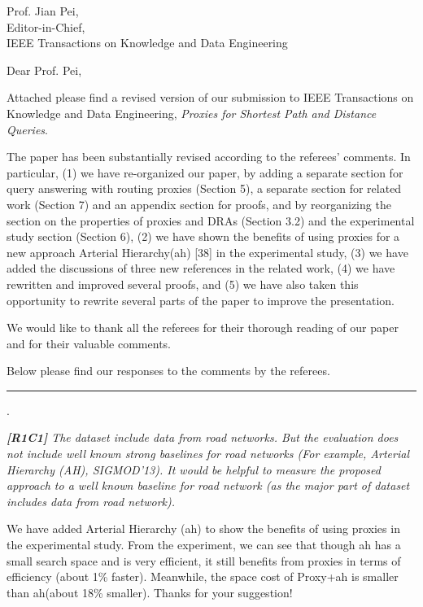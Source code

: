 \documentclass[11pt]{letter}
\date{}
\newcommand{\svs}{\vspace{0.36ex}}
\newcommand{\stitle}[1]{\vspace{0.5ex} \noindent{\bf #1}}
\newcommand{\ah}{{\sc ah}\xspace}
\begin{document}
\noindent
Prof. Jian Pei,\\
Editor-in-Chief,\\
IEEE Transactions on Knowledge and Data Engineering

\vspace{0.3cm}
\noindent
Dear Prof. Pei,


Attached please find a revised version of our submission to IEEE Transactions on Knowledge and Data Engineering,
{\em Proxies for Shortest Path and Distance Queries}.

The paper has been substantially revised according to the referees' comments. In particular,
%
(1) we have re-organized our paper, by adding a separate section for query answering with routing proxies (Section 5), a separate section for related work (Section 7) and an appendix section for proofs, and by reorganizing the section on the properties of proxies and DRAs (Section 3.2) and the experimental study section (Section 6),
%
(2) we have shown the benefits of using proxies for a new approach Arterial Hierarchy(\ah) [38] in the experimental study,
%
(3) we have added the discussions of three new references in the related work, 
%
(4) we have rewritten and improved several proofs, and
%
(5) we have also taken this opportunity to rewrite several parts of the paper to improve the presentation.



We would like to thank all the referees for their thorough reading of our
paper and for their valuable comments.

Below please find our responses to the comments by the referees.

\vspace{3.6ex}
\hrule
\vspace{0.6ex}

\vspace{2ex} \stitle{Response to the comments of Referee 1}.

{\em
{\bf [R1C1]} The dataset include data from road networks. But the evaluation does not include well known strong baselines for road networks (For example, Arterial Hierarchy (AH), SIGMOD'13).
It would be helpful to measure the proposed approach to a well known baseline for road network (as the major part of dataset includes data from road network).}
\svs

We have added Arterial Hierarchy (\ah) to show the benefits of using proxies in the experimental study.  From the experiment, we can see that though \ah has a small search space and is very efficient, it still benefits from proxies in terms of efficiency (about 1\% faster). Meanwhile, the space cost of Proxy+\ah is smaller than \ah (about 18\% smaller). Thanks for your suggestion!
\end{document}
